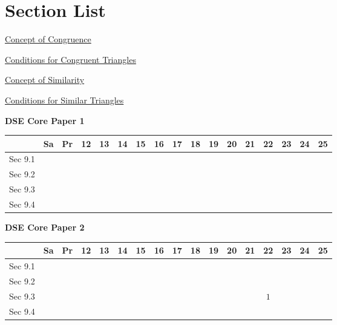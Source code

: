 \documentclass[12pt, a4paper]{article}
\begin{document}
\section*{Section List}
\begin{enumx}[label=Sec 9.\arabic*\ ]
\item \hyperref[section:1-9-1]{Concept of Congruence}
\item \hyperref[section:1-9-2]{Conditions for Congruent Triangles}
\item \hyperref[section:1-9-3]{Concept of Similarity}
\item \hyperref[section:1-9-4]{Conditions for Similar Triangles}
\end{enumx}
\begin{absolutelynopagebreak}
\begin{center}
\textbf{DSE Core Paper 1}
\end{center}
\begin{center}
\begin{tabular}{|l|c|c|c|c|c|c|c|c|c|c|c|c|c|c|c|c|}
\hline
        & Sa & Pr & 12 & 13 & 14 & 15 & 16 & 17 & 18 & 19 & 20 & 21 & 22 & 23 & 24 & 25 \\\hline\hline
Sec 9.1 &  &  &  &  &  &  &  &  &  &  &  &  &  &  &  &  \\\hline
Sec 9.2 &  &  &  &  &  &  &  &  &  &  &  &  &  &  &  &  \\\hline
Sec 9.3 &  &  &  &  &  &  &  &  &  &  &  &  &  &  &  &  \\\hline
Sec 9.4 &  &  &  &  &  &  &  &  &  &  &  &  &  &  &  &  \\\hline
\end{tabular}
\end{center}
\end{absolutelynopagebreak}
\begin{absolutelynopagebreak}
\begin{center}
\textbf{DSE Core Paper 2}
\end{center}
\begin{center}
\begin{tabular}{|l|c|c|c|c|c|c|c|c|c|c|c|c|c|c|c|c|}
\hline
        & Sa & Pr & 12 & 13 & 14 & 15 & 16 & 17 & 18 & 19 & 20 & 21 & 22 & 23 & 24 & 25 \\\hline\hline
Sec 9.1 &  &  &  &  &  &  &  &  &  &  &  &  &  &  &  &  \\\hline
Sec 9.2 &  &  &  &  &  &  &  &  &  &  &  &  &  &  &  &  \\\hline
Sec 9.3 &  &  &  &  &  &  &  &  &  &  &  &  &  $1$ &  &  &  \\\hline
Sec 9.4 &  &  &  &  &  &  &  &  &  &  &  &  &  &  &  &  \\\hline
\end{tabular}
\end{center}
\end{absolutelynopagebreak}
\end{document}
